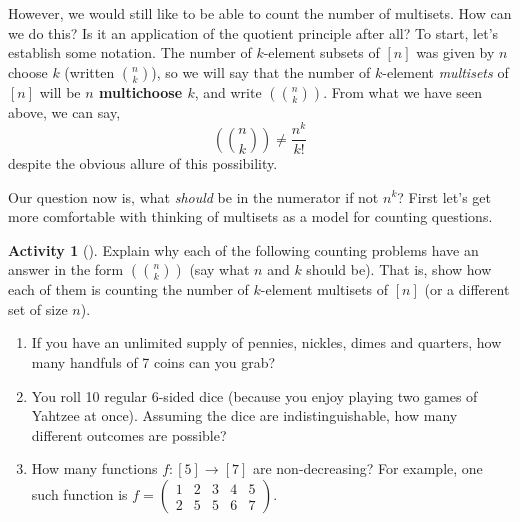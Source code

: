 \documentclass[10pt,]{book}
\newcommand{\terminology}[1]{\textbf{#1}}
\theoremstyle{plain}
\theoremstyle{definition}
\theoremstyle{definition}
\theoremstyle{definition}
\newtheorem{activity}[project]{Activity}
\numberwithin{equation}{chapter}
\newcommand{\mchoose}[2]{\left(\!\binom{#1}{#2}\!\right)}
\newcommand{\twoline}[2]{\begin{pmatrix}#1 \\ #2 \end{pmatrix}}
\newcommand{\amp}{&}
\begin{document}
\par
\hypertarget{p-808}{}%
However, we would still like to be able to count the number of multisets.  How can we do this?  Is it an application of the quotient principle after all?  To start, let's establish some notation.  The number of \(k\)-element subsets of \([n]\) was given by \(n\) choose \(k\) (written \(\binom{n}{k}\)), so we will say that the number of \(k\)-element \emph{multisets} of \([n]\) will be \terminology{\(n\) multichoose \(k\)}, and write \(\mchoose{n}{k}\).  From what we have seen above, we can say,%
\begin{equation*}
\mchoose{n}{k} \ne \frac{n^k}{k!}
\end{equation*}
despite the obvious allure of this possibility.%
\par
\hypertarget{p-809}{}%
Our question now is, what \emph{should} be in the numerator if not \(n^k\)?  First let's get more comfortable with thinking of multisets as a model for counting questions.%
\begin{activity}[]\label{activity-113}
\hypertarget{p-810}{}%
Explain why each of the following counting problems have an answer in the form \(\mchoose{n}{k}\) (say what \(n\) and \(k\) should be).  That is, show how each of them is counting the number of \(k\)-element multisets of \([n]\) (or a different set of size \(n\)).%
\begin{enumerate}[font=\bfseries,label=(\alph*),ref=\alph*]
\item\label{task-153} \hypertarget{p-811}{}%
If you have an unlimited supply of pennies, nickles, dimes and quarters, how many handfuls of 7 coins can you grab?%
\item\label{task-154} \hypertarget{p-812}{}%
You roll 10 regular 6-sided dice (because you enjoy playing two games of Yahtzee at once).  Assuming the dice are indistinguishable, how many different outcomes are possible?%
\item\label{task-155} \hypertarget{p-813}{}%
How many functions \(f:[5] \to [7]\) are non-decreasing?  For example, one such function is \(f = \twoline{1 \amp 2 \amp 3 \amp 4 \amp 5}{2 \amp 5 \amp 5 \amp 6 \amp 7}\).%
\end{enumerate}
\end{activity}
\end{document}
